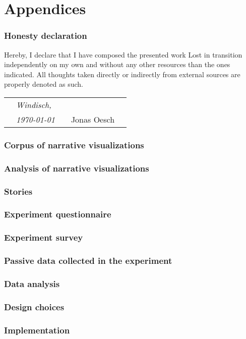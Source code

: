\newpage
\appendix
\part{Appendices}

\section{Honesty declaration}
Hereby, I declare that I have composed the presented work Lost in transition independently on my own and without any other resources than the ones indicated. All thoughts taken directly or indirectly from external sources are properly denoted as such.
\vspace{3cm}

\centering
\begin{tabular}{p{10mm}>{\centering\arraybackslash}p{50mm}p{10mm}
>{\centering\arraybackslash}p{50mm}p{10mm}}
&\textit{\large Windisch,}&&& \\
&\textit{\large  \today}&&\large Jonas Oesch& 
\end{tabular}

\newpage
\section{Corpus of narrative visualizations} \label{appendix-corpus}

\section{Analysis of narrative visualizations} \label{appendix-transition-analysis}

\section{Stories} \label{appendix-story}

\section{Experiment questionnaire} \label{appendix-questionnaire}

\section{Experiment survey} \label{appendix-survey}

\section{Passive data collected in the experiment} \label{appendix-passivedata}

\section{Data analysis} \label{appendix-dataanalysis}

\section{Design choices} \label{appendix-designchoices}

\section{Implementation} \label{appendix-implementation}

